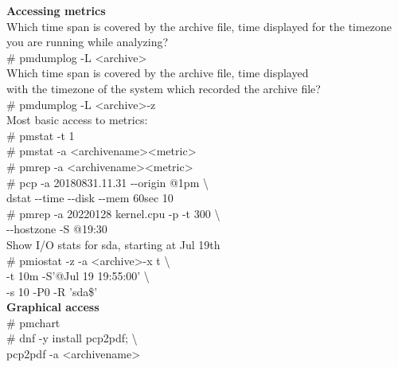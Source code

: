 \documentclass[12pt]{article}
\begin{document}
\begin{tcbposter}
{		\textbf{Accessing metrics} \\
		Which time span is covered by the archive file, time displayed
		for the timezone you are running while analyzing? \\
    	\hspace*{0.5cm}\# pmdumplog -L \textless archive\textgreater \\
		Which time span is covered by the archive file, time displayed \\
		with the timezone of the system which recorded the archive file? \\
    	\hspace*{0.5cm}\# pmdumplog -L \textless archive\textgreater -z \\
		Most basic access to metrics: \\
    	\hspace*{0.5cm}\# pmstat -t 1 \\
		\hspace*{0.5cm}\# pmstat -a \textless archivename\textgreater \textless metric\textgreater \\
		\hspace*{0.5cm}\# pmrep -a \textless archivename\textgreater \textless metric\textgreater \\
    	\hspace*{0.5cm}\# pcp -a 20180831.11.31 -\/-origin @1pm \textbackslash \\
    	\hspace*{1.0cm}   dstat -\/-time -\/-disk -\/-mem 60sec 10 \\
    	\hspace*{0.5cm}\# pmrep -a 20220128 kernel.cpu -p -t 300 \textbackslash \\
    	\hspace*{1.0cm}   -\/-hostzone -S @19:30 \\

		Show I/O stats for sda, starting at Jul 19th \\
    	\hspace*{0.5cm}\# pmiostat -z -a \textless archive\textgreater -x t \textbackslash \\
    	\hspace*{1.0cm}   -t 10m -S'@Jul 19 19:55:00' \textbackslash \\
    	\hspace*{1.0cm}   -s 10 -P0 -R 'sda\$' \\

		\textbf{Graphical access} \\
    	\hspace*{0.5cm}\# pmchart \\
    	\hspace*{0.5cm}\# dnf -y install pcp2pdf; \textbackslash \\
    	\hspace*{1.0cm}   pcp2pdf -a \textless archivename\textgreater \\
}


\end{tcbposter}
\end{document}
